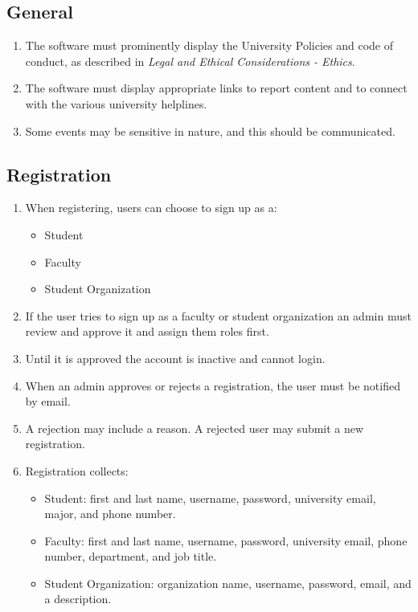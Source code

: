 	\subsection{General}
		\begin{enumerate}[leftmargin=3\parindent]
			\item The software must prominently display the University Policies and code of conduct, as described in \emph{Legal and Ethical Considerations - Ethics}.
			\item The software must display appropriate links to report content and to connect with the various university helplines.
			\item Some events may be sensitive in nature, and this should be communicated.
		\end{enumerate}


\subsection{Registration}
	\begin{enumerate}[leftmargin=3\parindent]
	\item When registering, users can choose to sign up as a:
		\begin{itemize}
			\item Student
			\item Faculty
			\item Student Organization
		\end{itemize}
	\item If the user tries to sign up as a faculty or student organization an admin must review and approve it and assign them roles first.
	\item Until it is approved the account is inactive and cannot login.
	\item When an admin approves or rejects a registration, the user must be notified by email.
	\item A rejection may include a reason. A rejected user may submit a new registration.
	\item Registration collects:
		\begin{itemize}
			\item Student: first and last name, username, password, university email, major, and phone number.
			\item Faculty: first and last name, username, password, university email, phone number, department, and job title.
			\item Student Organization: organization name, username, password, email, and a description.
		\end{itemize}
	\end{enumerate}
